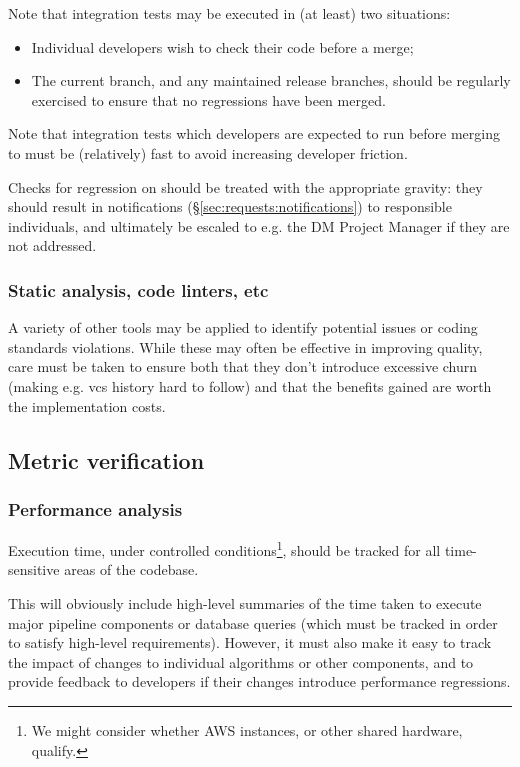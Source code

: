 \documentclass[DM,authoryear,toc,lsstdraft]{lsstdoc}
\begin{document}
Note that integration tests may be executed in (at least) two situations:

\begin{itemize}

  \item{Individual developers wish to check their code before a merge;}
  \item{The current  branch, and any maintained release branches,
  should be regularly exercised to ensure that no regressions have been
  merged.}

\end{itemize}

Note that integration tests which developers are expected to run before
merging to  must be (relatively) fast to avoid increasing
developer friction.

Checks for regression on  should be treated with the appropriate
gravity: they should result in notifications
(\S\ref{sec:requests:notifications}) to responsible individuals, and
ultimately be escaled to e.g. the DM Project Manager if they are not
addressed.

\subsubsection{Static analysis, code linters, etc}

A variety of other tools may be applied to identify potential issues or coding
standards violations. While these may often be effective in improving quality,
care must be taken to ensure both that they don't introduce excessive churn
(making e.g. \gls{vcs} history hard to follow) and that the benefits gained
are worth the implementation costs.

\subsection{Metric verification}

\subsubsection{Performance analysis}

Execution time, under controlled conditions\footnote{We might consider whether
AWS instances, or other shared hardware, qualify.}, should be tracked for all
time-sensitive areas of the codebase.

This will obviously include high-level summaries of the time taken to execute
major pipeline components or database queries (which must be tracked in order
to satisfy high-level requirements). However, it must also make it easy to
track the impact of changes to individual algorithms or other components, and
to provide feedback to developers if their changes introduce performance
regressions.
\end{document}

